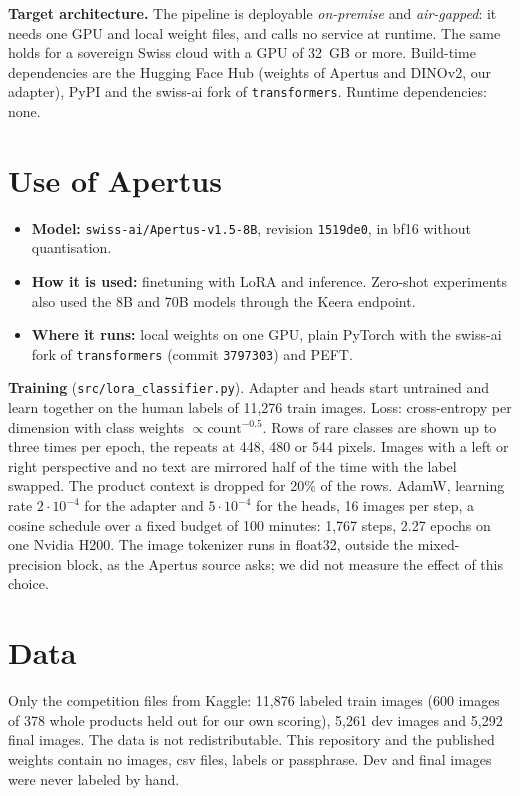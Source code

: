 \documentclass[10pt,a4paper]{article}
\newcommand{\code}[1]{\texttt{#1}}
\begin{document}
\textbf{Target architecture.} The pipeline is deployable \emph{on-premise} and \emph{air-gapped}: it needs one GPU
and local weight files, and calls no service at runtime. The same holds for a sovereign Swiss cloud with a GPU of
32~GB or more. Build-time dependencies are the Hugging Face Hub (weights of Apertus and DINOv2, our adapter),
PyPI and the swiss-ai fork of \code{transformers}. Runtime dependencies: none.

\section{Use of Apertus}

\begin{itemize}
\item \textbf{Model:} \code{swiss-ai/Apertus-v1.5-8B}, revision \code{1519de0}, in bf16 without quantisation.
\item \textbf{How it is used:} finetuning with LoRA and inference. Zero-shot experiments also used the 8B and 70B
models through the Keera endpoint.
\item \textbf{Where it runs:} local weights on one GPU, plain PyTorch with the swiss-ai fork of \code{transformers}
(commit \code{3797303}) and PEFT.
\end{itemize}

\textbf{Training} (\code{src/lora\_classifier.py}). Adapter and heads start untrained and learn together on the
human labels of 11{,}276 train images. Loss: cross-entropy per dimension with class weights
$\propto \mathrm{count}^{-0.5}$. Rows of rare classes are shown up to three times per epoch, the repeats at 448, 480
or 544 pixels. Images with a left or right perspective and no text are mirrored half of the time with the label
swapped. The product context is dropped for 20\% of the rows. AdamW, learning rate $2\cdot10^{-4}$ for the adapter
and $5\cdot10^{-4}$ for the heads, 16 images per step, a cosine schedule over a fixed budget of 100 minutes:
1{,}767 steps, 2.27 epochs on one Nvidia H200. The image tokenizer runs in float32, outside the mixed-precision
block, as the Apertus source asks; we did not measure the effect of this choice.

\section{Data}

Only the competition files from Kaggle: 11{,}876 labeled train images (600 images of 378 whole products held out
for our own scoring), 5{,}261 dev images and 5{,}292 final images. The data is not redistributable. This repository
and the published weights contain no images, csv files, labels or passphrase. Dev and final images were never
labeled by hand.
\end{document}
